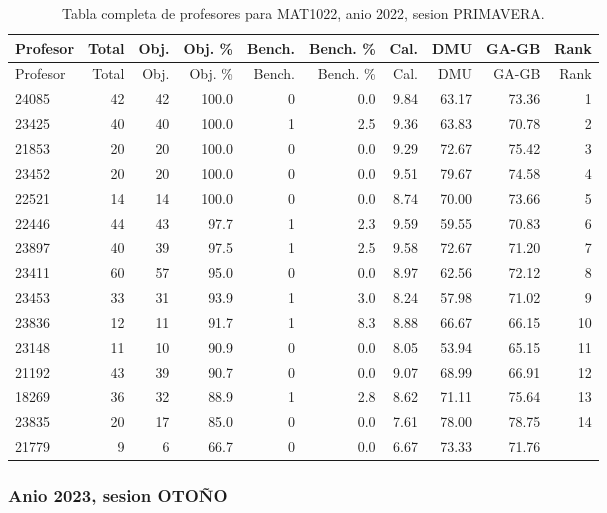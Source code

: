 \begingroup
\scriptsize
\setlength{\tabcolsep}{3pt}
\begin{longtable}{lrrrrrrrrr}
\caption{Tabla completa de profesores para MAT1022, anio 2022, sesion PRIMAVERA.}\label{tab:prof-period-mat1022-2022-primavera}\\
\toprule
Profesor & Total & Obj. & Obj. \% & Bench. & Bench. \% & Cal. & DMU & GA-GB & Rank \\
\midrule
\endfirsthead
\toprule
Profesor & Total & Obj. & Obj. \% & Bench. & Bench. \% & Cal. & DMU & GA-GB & Rank \\
\midrule
\endhead
24085 & 42 & 42 & 100.0 & 0 & 0.0 & 9.84 & 63.17 & 73.36 & 1 \\
23425 & 40 & 40 & 100.0 & 1 & 2.5 & 9.36 & 63.83 & 70.78 & 2 \\
21853 & 20 & 20 & 100.0 & 0 & 0.0 & 9.29 & 72.67 & 75.42 & 3 \\
23452 & 20 & 20 & 100.0 & 0 & 0.0 & 9.51 & 79.67 & 74.58 & 4 \\
22521 & 14 & 14 & 100.0 & 0 & 0.0 & 8.74 & 70.00 & 73.66 & 5 \\
22446 & 44 & 43 & 97.7 & 1 & 2.3 & 9.59 & 59.55 & 70.83 & 6 \\
23897 & 40 & 39 & 97.5 & 1 & 2.5 & 9.58 & 72.67 & 71.20 & 7 \\
23411 & 60 & 57 & 95.0 & 0 & 0.0 & 8.97 & 62.56 & 72.12 & 8 \\
23453 & 33 & 31 & 93.9 & 1 & 3.0 & 8.24 & 57.98 & 71.02 & 9 \\
23836 & 12 & 11 & 91.7 & 1 & 8.3 & 8.88 & 66.67 & 66.15 & 10 \\
23148 & 11 & 10 & 90.9 & 0 & 0.0 & 8.05 & 53.94 & 65.15 & 11 \\
21192 & 43 & 39 & 90.7 & 0 & 0.0 & 9.07 & 68.99 & 66.91 & 12 \\
18269 & 36 & 32 & 88.9 & 1 & 2.8 & 8.62 & 71.11 & 75.64 & 13 \\
23835 & 20 & 17 & 85.0 & 0 & 0.0 & 7.61 & 78.00 & 78.75 & 14 \\
21779 & 9 & 6 & 66.7 & 0 & 0.0 & 6.67 & 73.33 & 71.76 &  \\
\bottomrule
\end{longtable}
\endgroup

\subsubsection{Anio 2023, sesion OTOÑO}

